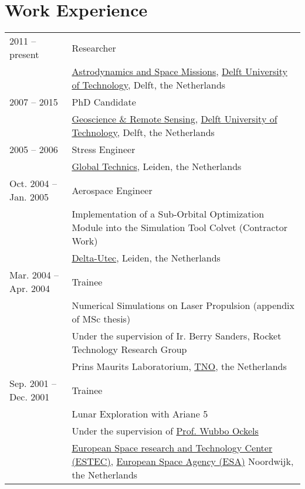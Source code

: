 \documentclass[a4paper]{article}
\newenvironment{cvsection}[2]{
  \vspace{0.2in}
  \section*{#1}
  \vspace{-0.2in}
  \def\arraystretch{1.33}
  \begin{longtable}{lp{#2}}
}{
  \end{longtable}
}
\begin{document}

\begin{cvsection}{Work Experience}{10.8cm}

2011 -- present
  & Researcher \\
  & \href{http://www.as.lr.tudelft.nl}{Astrodynamics and Space Missions},
    \href{http://www.tudelft.nl/}{Delft University of Technology},
    Delft, the Netherlands\\
\hline
2007 -- 2015
  & PhD Candidate\\
  & \href{http://www.citg.tudelft.nl/over-faculteit/afdelingen/geoscience-and-remote-sensing/}{Geoscience \& Remote Sensing},
    \href{http://www.tudelft.nl/}{Delft University of Technology},
    Delft, the Netherlands\\
\hline
2005 -- 2006
  & Stress Engineer\\
  & \href{http://www.globaltechnics.nl/}{Global Technics},
    Leiden, the Netherlands\\

\hline
Oct. 2004 -- Jan. 2005
  & Aerospace Engineer \\
  & Implementation of a Sub-Orbital Optimization Module into the Simulation Tool Colvet (Contractor Work)\\
  & \href{http://www.delta-utec.com/}{Delta-Utec},
    Leiden, the Netherlands\\
\hline
Mar. 2004 -- Apr. 2004
  & Trainee \\
  & Numerical Simulations on Laser Propulsion (appendix of MSc thesis)\\
  & Under the supervision of Ir. Berry Sanders, Rocket Technology Research Group\\
  & Prins Maurits Laboratorium,
   \href{http://www.tno.nl/}{TNO}, the Netherlands\\
\hline
Sep. 2001 -- Dec. 2001
  & Trainee \\
  & Lunar Exploration with Ariane 5\\
  & Under the supervision of \href{https://en.wikipedia.org/wiki/Wubbo_Ockels}{Prof. Wubbo Ockels}\\
  & \href{http://www.esa.int/About_Us/ESTEC}{European Space research and Technology Center (ESTEC)},
    \href{http://www.esa.int}{European Space Agency (ESA)}
    Noordwijk, the Netherlands\\

\end{cvsection}
\end{document}
